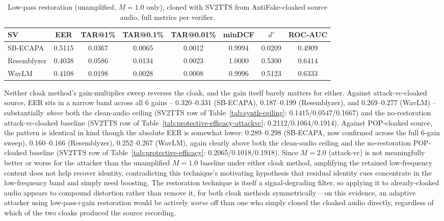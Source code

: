 \documentclass[11pt]{article}
\begin{document}
\begin{table}[H]
\centering
\caption{Low-pass restoration (unamplified, $M=1.0$ only), cloned with
SV2TTS from AntiFake-cloaked source audio, full metrics per verifier.}
\label{tab:restoration-lowpass-antifake-results}
\begin{tabular}{lccccccc}
\toprule
SV & EER & TAR@1\% & TAR@0.1\% & TAR@0.01\% & minDCF & $d'$ & ROC-AUC \\
\midrule
SB-ECAPA    & 0.5115 & 0.0367 & 0.0065 & 0.0012 & 0.9994 & 0.0209 & 0.4909 \\
Resemblyzer & 0.4038 & 0.0586 & 0.0134 & 0.0023 & 1.0000 & 0.5300 & 0.6414 \\
WavLM       & 0.4108 & 0.0198 & 0.0028 & 0.0008 & 0.9996 & 0.5123 & 0.6333 \\
\bottomrule
\end{tabular}
\end{table}

Neither cloak method's gain-multiplier sweep reverses the cloak, and
the gain itself barely matters for either. Against attack-vc-cloaked
source, EER sits in a narrow band across all 6 gains -- 0.320--0.331
(SB-ECAPA), 0.187--0.199 (Resemblyzer), and 0.269--0.277 (WavLM) --
substantially \emph{above} both the clean-audio ceiling (SV2TTS row of
Table~\ref{tab:synth-ceiling}: 0.1415/0.0547/0.1667) and the
no-restoration attack-vc-cloaked baseline (SV2TTS row of
Table~\ref{tab:protective-efficacy-attackvc}: 0.2112/0.1064/0.1914).
Against POP-cloaked source, the pattern is identical in kind though
the absolute EER is somewhat lower: 0.289--0.298 (SB-ECAPA, now
confirmed across the full 6-gain sweep), 0.160--0.166 (Resemblyzer),
0.252--0.267 (WavLM), again clearly above
both the clean-audio ceiling and the no-restoration POP-cloaked
baseline (SV2TTS row of Table~\ref{tab:protective-efficacy}:
0.2065/0.1018/0.1918). Since $M=2.0$ (attack-vc) is not meaningfully
better or worse for the attacker than the unamplified $M=1.0$ baseline
under either cloak method, amplifying the retained low-frequency
content does not help recover identity, contradicting this technique's
motivating hypothesis that residual identity cues concentrate in the
low-frequency band and simply need boosting. The restoration technique
is itself a signal-degrading filter, so applying it to already-cloaked
audio appears to compound distortion rather than remove it, for both
cloak methods symmetrically -- on this evidence, an adaptive attacker
using low-pass+gain restoration would be actively \emph{worse} off than
one who simply cloned the cloaked audio directly, regardless of which
of the two cloaks produced the source recording.
\end{document}

